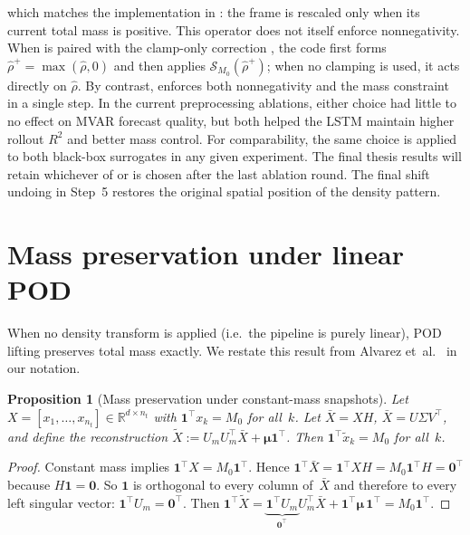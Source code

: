 \documentclass{report}
\theoremstyle{plain}
\newtheorem{proposition}[theorem]{Proposition}
\theoremstyle{remark}
\numberwithin{equation}{section}              %
\begin{document}
which matches the implementation in : the frame is
rescaled only when its current total mass is positive.  This operator does
not itself enforce nonnegativity.  When  is paired with the
clamp-only correction , the code first forms
$\hat\rho^{+}=\max(\hat\rho,0)$ and then applies
$\mathcal{S}_{M_0}(\hat\rho^{+})$; when no clamping is used, it acts directly
on $\hat\rho$.  By contrast,  enforces both nonnegativity and the
mass constraint in a single step.  In the current preprocessing ablations,
either choice had little to no effect on MVAR forecast quality, but both
helped the LSTM maintain higher rollout $R^2$ and better mass control.  For
comparability, the same  choice is applied to both
black-box surrogates in any given experiment.  The final thesis results will
retain whichever of  or  is chosen after the last
ablation round.  The final shift undoing in Step~5 restores the original
spatial position of the density pattern.

%
\section{Mass preservation under linear POD}
\label{sec:mass_preservation}

When no density transform is applied (i.e.\ the pipeline is purely linear),
POD lifting preserves total mass exactly.  We restate this result from
Alvarez et~al.~\cite{alvarez2025eqfree} in our notation.

\begin{proposition}[Mass preservation under constant-mass snapshots]
\label{prop:mass_preservation}
Let $X=[x_1,\dots,x_{n_t}]\in\mathbb{R}^{d\times n_t}$ with
$\mathbf{1}^\top x_k = M_0$ for all~$k$.
Let $\bar{X}=XH$, $\bar{X}=U\Sigma V^\top$, and define the reconstruction
$\tilde{X}:=U_m U_m^\top\bar{X}+\boldsymbol{\mu}\mathbf{1}^\top$.
Then $\mathbf{1}^\top\tilde{x}_k=M_0$ for all~$k$.
\end{proposition}

\begin{proof}
Constant mass implies $\mathbf{1}^\top X = M_0\mathbf{1}^\top$.  Hence
$\mathbf{1}^\top\bar{X}=\mathbf{1}^\top XH = M_0\mathbf{1}^\top H
=\mathbf{0}^\top$ because $H\mathbf{1}=\mathbf{0}$.
So $\mathbf{1}$ is orthogonal to every column of~$\bar{X}$ and therefore to
every left singular vector: $\mathbf{1}^\top U_m=\mathbf{0}^\top$.
Then
$\mathbf{1}^\top\tilde{X}
= \underbrace{\mathbf{1}^\top U_m}_{\mathbf{0}^\top} U_m^\top\bar{X}
  +\mathbf{1}^\top\boldsymbol{\mu}\,\mathbf{1}^\top
= M_0\mathbf{1}^\top$.
\end{proof}
\end{document}
